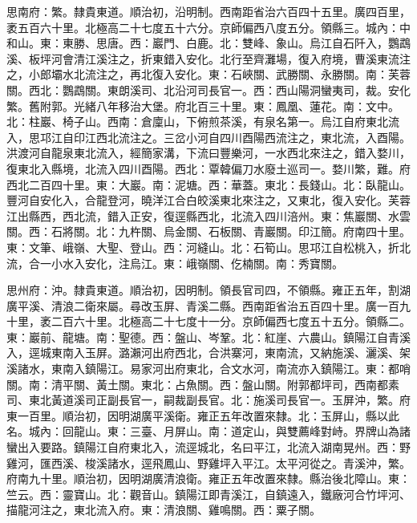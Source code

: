 \begin{pinyinscope}
思南府：繁。隸貴東道。順治初，沿明制。西南距省治六百四十五里。廣四百里，袤五百六十里。北極高二十七度五十六分。京師偏西八度五分。領縣三。城內：中和山。東：東勝、思唐。西：巖門、白鹿。北：雙峰、象山。烏江自石阡入，鸚鵡溪、板坪河會清江溪注之，折東錯入安化。北行至齊灘場，復入府境，曹溪東流注之，小郎壩水北流注之，再北復入安化。東：石峽關、武勝關、永勝關。南：芙蓉關。西北：鸚鵡關。東朗溪司、北沿河司長官一。西：西山陽洞蠻夷司，裁。安化繁。舊附郭。光緒八年移治大堡。府北百三十里。東：鳳凰、蓮花。南：文中。北：柱巖、椅子山。西南：倉廩山，下俯煎茶溪，有泉名第一。烏江自府東北流入，思邛江自印江西北流注之。三岔小河自四川酉陽西流注之，東北流，入酉陽。洪渡河自龍泉東北流入，經簡家溝，下流曰豐樂河，一水西北來注之，錯入婺川，復東北入縣境，北流入四川酉陽。西北：覃韓偏刀水廢土巡司一。婺川繁，難。府西北二百四十里。東：大巖。南：泥塘。西：華蓋。東北：長錢山。北：臥龍山。豐河自安化入，合龍登河，曉洋江合白皎溪東北來注之，又東北，復入安化。芙蓉江出縣西，西北流，錯入正安，復逕縣西北，北流入四川涪州。東：焦巖關、水雲關。西：石將關。北：九杵關、烏金關、石板關、青巖關。印江簡。府南四十里。東：文筆、峨嶺、大聖、登山。西：河縫山。北：石筍山。思邛江自松桃入，折北流，合一小水入安化，注烏江。東：峨嶺關、仡楠關。南：秀寶關。

思州府：沖。隸貴東道。順治初，因明制。領長官司四，不領縣。雍正五年，割湖廣平溪、清浪二衛來屬。尋改玉屏、青溪二縣。西南距省治五百四十里。廣一百九十里，袤二百六十里。北極高二十七度十一分。京師偏西七度五十五分。領縣二。東：巖前、龍塘。南：聖德。西：盤山、岑鞏。北：紅崖、六農山。鎮陽江自青溪入，逕城東南入玉屏。潞瀨河出府西北，合洪寨河，東南流，又納施溪、灑溪、架溪諸水，東南入鎮陽江。易家河出府東北，合文水河，南流亦入鎮陽江。東：都哨關。南：清平關、黃土關。東北：占魚關。西：盤山關。附郭都坪司，西南都素司、東北黃道溪司正副長官一，嗣裁副長官。北：施溪司長官一。玉屏沖，繁。府東一百里。順治初，因明湖廣平溪衛。雍正五年改置來隸。北：玉屏山，縣以此名。城內：回龍山。東：三臺、月屏山。南：道定山，與雙薦峰對峙。界牌山為諸蠻出入要路。鎮陽江自府東北入，流逕城北，名曰平江，北流入湖南晃州。西：野雞河，匯西溪、梭溪諸水，逕飛鳳山、野雞坪入平江。太平河從之。青溪沖，繁。府南九十里。順治初，因明湖廣清浪衛。雍正五年改置來隸。縣治後北障山。東：竺云。西：靈寶山。北：觀音山。鎮陽江即青溪江，自鎮遠入，鐵廠河合竹坪河、描龍河注之，東北流入府。東：清浪關、雞鳴關。西：粟子關。


\end{pinyinscope}
